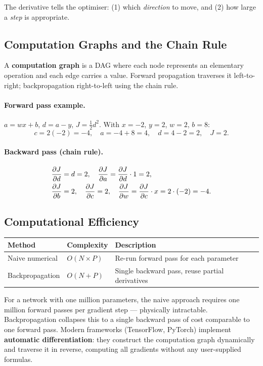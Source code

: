 The derivative tells the optimiser: (1) which \emph{direction} to move, and
(2) how large a \emph{step} is appropriate.

\subsection{Computation Graphs and the Chain Rule}

\begin{definition}
A \textbf{computation graph} is a DAG where each node represents an elementary
operation and each edge carries a value. Forward propagation traverses it
left-to-right; backpropagation right-to-left using the chain rule.
\end{definition}

\paragraph{Forward pass example.}
$a=wx+b$, $d=a-y$, $J=\tfrac{1}{2}d^2$.
With $x=-2$, $y=2$, $w=2$, $b=8$:
\[c=2(-2)=-4,\quad a=-4+8=4,\quad d=4-2=2,\quad J=2.\]

\paragraph{Backward pass (chain rule).}
\begin{align*}
\dfrac{\partial J}{\partial d}&=d=2,\quad
\dfrac{\partial J}{\partial a}=\dfrac{\partial J}{\partial d}\cdot 1=2,\\
\dfrac{\partial J}{\partial b}&=2,\quad
\dfrac{\partial J}{\partial c}=2,\quad
\dfrac{\partial J}{\partial w}=\dfrac{\partial J}{\partial c}\cdot x=2\cdot(-2)=-4.
\end{align*}

\subsection{Computational Efficiency}

\begin{center}
\begin{tabular}{lll}
\toprule
\textbf{Method} & \textbf{Complexity} & \textbf{Description}\\
\midrule
Naive numerical  & $O(N\times P)$ & Re-run forward pass for each parameter\\
Backpropagation  & $O(N+P)$       & Single backward pass, reuse partial derivatives\\
\bottomrule
\end{tabular}
\end{center}

For a network with one million parameters, the naive approach requires one
million forward passes per gradient step — physically intractable. Backpropagation
collapses this to a single backward pass of cost comparable to one forward pass.
Modern frameworks (TensorFlow, PyTorch) implement \textbf{automatic
differentiation}: they construct the computation graph dynamically and traverse
it in reverse, computing all gradients without any user-supplied formulas.

